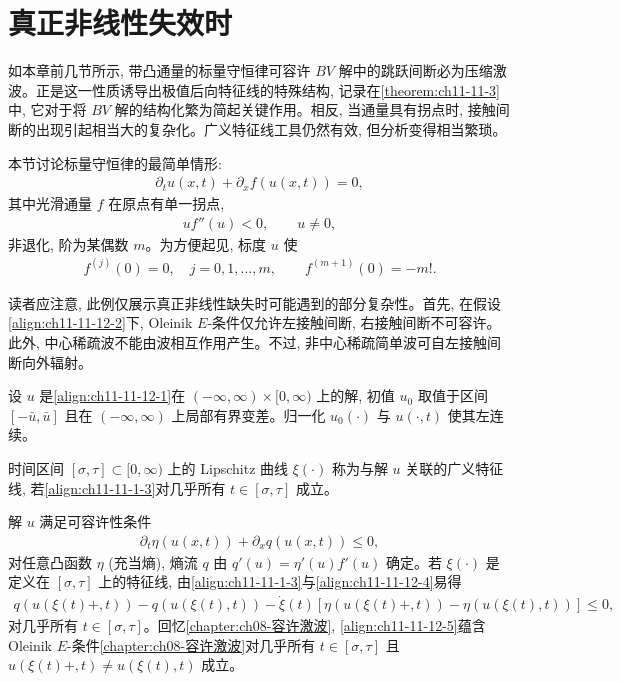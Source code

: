 \documentclass[../../main.tex]{subfiles}
\begin{document}
\section{真正非线性失效时}\label{section:ch11-真正非线性失效时}

如本章前几节所示, 带凸通量的标量守恒律可容许 $BV$ 解中的跳跃间断必为压缩激波。正是这一性质诱导出极值后向特征线的特殊结构, 记录在\cref{theorem:ch11-11-3}中, 它对于将 $BV$ 解的结构化繁为简起关键作用。相反, 当通量具有拐点时, 接触间断的出现引起相当大的复杂化。广义特征线工具仍然有效, 但分析变得相当繁琐。

本节讨论标量守恒律的最简单情形:
\begin{align}
\partial_t u(x,t)+\partial_x f(u(x,t))=0,\label{align:ch11-11-12-1}
\end{align}
其中光滑通量 $f$ 在原点有单一拐点,
\begin{align}
u f''(u)<0,\qquad u\neq0,\label{align:ch11-11-12-2}
\end{align}
非退化, 阶为某偶数 $m$。为方便起见, 标度 $u$ 使
\begin{align}
f^{(j)}(0)=0,\quad j=0,1,\ldots,m,\qquad f^{(m+1)}(0)=-m!.\label{align:ch11-11-12-3}
\end{align}

读者应注意, 此例仅展示真正非线性缺失时可能遇到的部分复杂性。首先, 在假设\eqref{align:ch11-11-12-2}下, Oleinik $E$-条件仅允许左接触间断, 右接触间断不可容许。此外, 中心稀疏波不能由波相互作用产生。不过, 非中心稀疏简单波可自左接触间断向外辐射。

设 $u$ 是\eqref{align:ch11-11-12-1}在 $(-\infty,\infty)\times[0,\infty)$ 上的解, 初值 $u_0$ 取值于区间 $[-\bar u,\bar u]$ 且在 $(-\infty,\infty)$ 上局部有界变差。归一化 $u_0(\cdot)$ 与 $u(\cdot,t)$ 使其左连续。

时间区间 $[\sigma,\tau]\subset[0,\infty)$ 上的 Lipschitz 曲线 $\xi(\cdot)$ 称为与解 $u$ 关联的广义特征线, 若\eqref{align:ch11-11-1-3}对几乎所有 $t\in[\sigma,\tau]$ 成立。

解 $u$ 满足可容许性条件
\begin{align}
\partial_t\eta(u(x,t))+\partial_x q(u(x,t))\leqslant0,\label{align:ch11-11-12-4}
\end{align}
对任意凸函数 $\eta$ (充当熵), 熵流 $q$ 由 $q'(u)=\eta'(u)f'(u)$ 确定。若 $\xi(\cdot)$ 是定义在 $[\sigma,\tau]$ 上的特征线, 由\eqref{align:ch11-11-1-3}与\eqref{align:ch11-11-12-4}易得
\begin{align}
q(u(\xi(t)+,t))-q(u(\xi(t),t))-\dot{\xi}(t)[\eta(u(\xi(t)+,t))-\eta(u(\xi(t),t))]\leqslant0,\label{align:ch11-11-12-5}
\end{align}
对几乎所有 $t\in[\sigma,\tau]$。回忆\cref{chapter:ch08-容许激波}, \eqref{align:ch11-11-12-5}蕴含 Oleinik $E$-条件\cref{chapter:ch08-容许激波}对几乎所有 $t\in[\sigma,\tau]$ 且 $u(\xi(t)+,t)\neq u(\xi(t),t)$ 成立。
\end{document}
